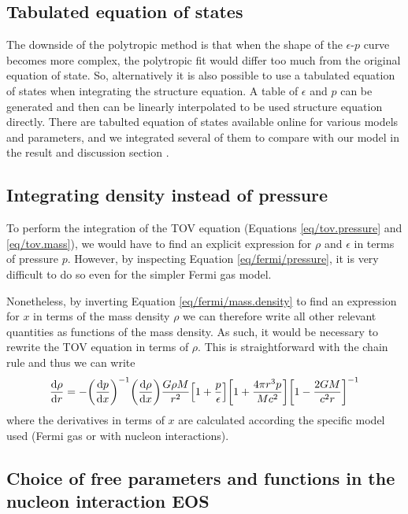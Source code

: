 \documentclass[draft,11pt]{article}
\theoremstyle{definition}
\theoremstyle{remark}
\begin{document}
        \subsection{Tabulated equation of states}
            The downside of the polytropic method is that when the shape of the $\epsilon$-$p$ curve becomes more complex, the polytropic fit would differ too much from the original equation of state. So, alternatively it is also possible to use a tabulated equation of states when integrating the structure equation. A table of $\epsilon$ and $p$ can be generated and then can be linearly interpolated to be used structure equation directly. There are tabulted equation of states available online for various models and parameters, and we integrated several of them to compare with our model in the result and discussion section \cite{arizona/eos.table}.

        \subsection{Integrating density instead of pressure}
            To perform the integration of the TOV equation (Equations \ref{eq/tov.pressure} and \ref{eq/tov.mass}), we would have to find an explicit expression for $\rho$ and $\epsilon$ in terms of pressure $p$. However, by inspecting Equation \ref{eq/fermi/pressure}, it is very difficult to do so even for the simpler Fermi gas model.
            
            Nonetheless, by inverting Equation \ref{eq/fermi/mass.density} to find an expression for $x$ in terms of the mass density $\rho$ we can therefore write all other relevant quantities as functions of the mass density. As such, it would be necessary to rewrite the TOV equation in terms of $\rho$. This is straightforward with the chain rule and thus we can write \begin{equation}\label{eq/tov.density}\dv{\rho}{r}=-\qty(\dv{p}{x})^{-1}\qty(\dv{\rho}{x})\frac{G\rho M}{r^{2}}\qty[1+\frac{p}{\epsilon}]\qty[1+\frac{4\pi r^{3}p}{Mc^{2}}]\qty[1-\frac{2GM}{c^{2}r}]^{-1}\end{equation} where the derivatives in terms of $x$ are calculated according the specific model used (Fermi gas or with nucleon interactions).
            
        \subsection{Choice of free parameters and functions in the nucleon interaction EOS}
    
\end{document}
